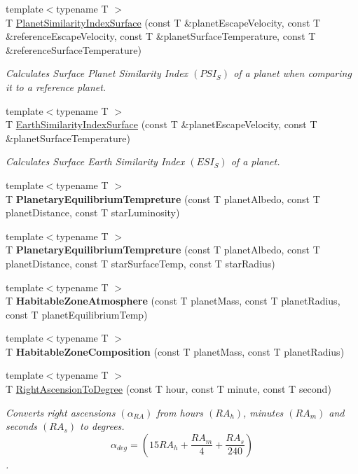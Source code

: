 \begin{DoxyCompactItemize}
{\footnotesize template$<$typename T $>$ }\\T \mbox{\hyperlink{group___e_g_x_phys-_planet_criteria_gae0c7dce2779d66b0560ca388a34ddc39}{Planet\+Similarity\+Index\+Surface}} (const T \&planet\+Escape\+Velocity, const T \&reference\+Escape\+Velocity, const T \&planet\+Surface\+Temperature, const T \&reference\+Surface\+Temperature)
\begin{DoxyCompactList}\small\item\em Calculates Surface Planet Similarity Index $(PSI_S)$ of a planet when comparing it to a reference planet. \end{DoxyCompactList}\item 
{\footnotesize template$<$typename T $>$ }\\T \mbox{\hyperlink{group___e_g_x_phys-_planet_criteria_ga1df772b0ed354ca7f7e4a7a4af072325}{Earth\+Similarity\+Index\+Surface}} (const T \&planet\+Escape\+Velocity, const T \&planet\+Surface\+Temperature)
\begin{DoxyCompactList}\small\item\em Calculates Surface Earth Similarity Index $(ESI_S)$ of a planet. \end{DoxyCompactList}\item 
{\footnotesize template$<$typename T $>$ }\\T {\bfseries Planetary\+Equilibrium\+Tempreture} (const T planet\+Albedo, const T planet\+Distance, const T star\+Luminosity)
\item 
{\footnotesize template$<$typename T $>$ }\\T {\bfseries Planetary\+Equilibrium\+Tempreture} (const T planet\+Albedo, const T planet\+Distance, const T star\+Surface\+Temp, const T star\+Radius)
\item 
{\footnotesize template$<$typename T $>$ }\\T {\bfseries Habitable\+Zone\+Atmosphere} (const T planet\+Mass, const T planet\+Radius, const T planet\+Equilibrium\+Temp)
\item 
{\footnotesize template$<$typename T $>$ }\\T {\bfseries Habitable\+Zone\+Composition} (const T planet\+Mass, const T planet\+Radius)
\item 
{\footnotesize template$<$typename T $>$ }\\T \mbox{\hyperlink{group___e_g_x_phys-_astrophysics-_right_ascension_ga27ba790eb8358535613d3b32f97d9e3a}{Right\+Ascension\+To\+Degree}} (const T hour, const T minute, const T second)
\begin{DoxyCompactList}\small\item\em Converts right ascensions $(\alpha_{RA})$ from hours $(RA_h)$, minutes $(RA_m)$ and seconds $(RA_s)$ to degrees. \[\alpha_{deg}=(15 RA_h + \frac{RA_m}{4} + \frac{RA_s}{240})\]. \end{DoxyCompactList}\item 

\end{DoxyCompactItemize}
